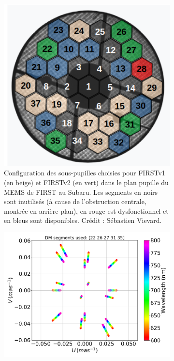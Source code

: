 \begin{figure}[ht!]
    \centering
    \begin{subfigure}[t]{0.43\textwidth}
        \centering
        \includegraphics[width=\textwidth]{Figure_Chap5/BaselineMap_Subaru_V1_V2_20221010.png}
        \caption{Configuration des sous-pupilles choisies pour FIRSTv1 (en beige) et FIRSTv2 (en vert) dans le plan pupille du MEMS de FIRST au Subaru. Les segments en noirs sont inutilisés (à cause de l'obstruction centrale, montrée en arrière plan), en rouge est dysfonctionnel et en bleus sont disponibles. Crédit : Sébastien Vievard.}
        \label{fig:SegUVSubaruB}
    \end{subfigure}\hfill
    \begin{subfigure}[t]{0.55\textwidth}
        \centering
        \includegraphics[width=\textwidth]{Figure_Chap5/UVplane_Subaru_22_26_27_31_35.png}

\end{subfigure}
\end{figure}
